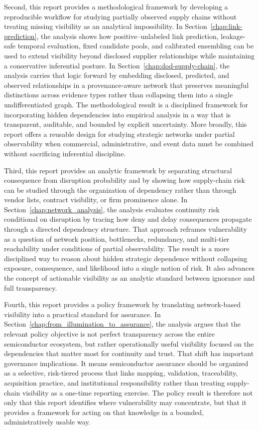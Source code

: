 Second, this report provides a methodological framework by developing a reproducible workflow for studying partially observed supply chains without treating missing visibility as an analytical impossibility. In Section~\ref{chap:link-prediction}, the analysis shows how positive--unlabeled link prediction, leakage-safe temporal evaluation, fixed candidate pools, and calibrated ensembling can be used to extend visibility beyond disclosed supplier relationships while maintaining a conservative inferential posture. In Section~\ref{chap:dod-supply-chain}, the analysis carries that logic forward by embedding disclosed, predicted, and observed relationships in a provenance-aware network that preserves meaningful distinctions across evidence types rather than collapsing them into a single undifferentiated graph. The methodological result is a disciplined framework for incorporating hidden dependencies into empirical analysis in a way that is transparent, auditable, and bounded by explicit uncertainty. More broadly, this report offers a reusable design for studying strategic networks under partial observability when commercial, administrative, and event data must be combined without sacrificing inferential discipline.

Third, this report provides an analytic framework by separating structural consequence from disruption probability and by showing how supply-chain risk can be studied through the organization of dependency rather than through vendor lists, contract visibility, or firm prominence alone. In Section~\ref{chap:network_analysis}, the analysis evaluates continuity risk conditional on disruption by tracing how deny and delay consequences propagate through a directed dependency structure. That approach reframes vulnerability as a question of network position, bottlenecks, redundancy, and multi-tier reachability under conditions of partial observability. The result is a more disciplined way to reason about hidden strategic dependence without collapsing exposure, consequence, and likelihood into a single notion of risk. It also advances the concept of actionable visibility as an analytic standard between ignorance and full transparency.

Fourth, this report provides a policy framework by translating network-based visibility into a practical standard for assurance. In Section~\ref{chap:from_illumination_to_assurance}, the analysis argues that the relevant policy objective is not perfect transparency across the entire semiconductor ecosystem, but rather operationally useful visibility focused on the dependencies that matter most for continuity and trust. That shift has important governance implications. It means semiconductor assurance should be organized as a selective, risk-tiered process that links mapping, validation, traceability, acquisition practice, and institutional responsibility rather than treating supply-chain visibility as a one-time reporting exercise. The policy result is therefore not only that this report identifies where vulnerability may concentrate, but that it provides a framework for acting on that knowledge in a bounded, administratively usable way.

